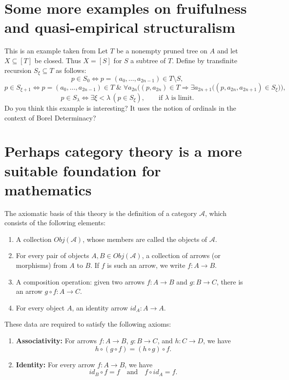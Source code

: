 \documentclass[11pt,a4paper]{book}
\theoremstyle{plain}
\begin{document}
\section{Some more examples on fruifulness and quasi-empirical structuralism}
This is an example taken from \textcite[139]{Kechris1995} Let $T$ be a nonempty pruned tree on $A$ and let $X \subseteq [T]$ be closed. Thus $X=[S]$ for $S$ a subtree of $T$. Define by transfinite recursion $S_\xi \subseteq T$ as follows: \[ p \in S_0 \iff p=(a_0,\ldots,a_{2n-1}) \in T \setminus S, \] \[ p \in S_{\xi+1} \iff p=(a_0,\ldots,a_{2n-1}) \in T \;\&\; \forall a_{2n} \bigl( (p, a_{2n}) \in T \Rightarrow \exists a_{2n+1} \bigl( (p, a_{2n}, a_{2n+1}) \in S_\xi \bigr) \bigr), \] \[ p \in S_\lambda \iff \exists \xi < \lambda \, (p \in S_\xi), \qquad \text{if $\lambda$ is limit.} \] Do you think this example is interesting? It uses the notion of ordinals in the context of Borel Determinacy?

\section{Perhaps category theory is a more suitable foundation for mathematics}

The axiomatic basis of this theory is the definition of a category $\mathcal{A}$, which consists of the following elements:

\begin{enumerate}
  \item A collection $Obj(\mathcal{A})$, whose members are called the objects of $\mathcal{A}$.
  \item For every pair of objects $A, B \in Obj(\mathcal{A})$, a collection of arrows (or morphisms) from $A$ to $B$. If $f$ is such an arrow, we write $f: A \rightarrow B$.
  \item A composition operation: given two arrows $f: A \rightarrow B$ and $g: B \rightarrow C$, there is an arrow $g \circ f: A \rightarrow C$.
  \item For every object $A$, an identity arrow $id_A: A \rightarrow A$.
\end{enumerate}

These data are required to satisfy the following axioms:

\begin{enumerate}
  \item \textbf{Associativity:} For arrows $f: A \rightarrow B$, $g: B \rightarrow C$, and $h: C \rightarrow D$, we have
  \[
  h \circ (g \circ f) = (h \circ g) \circ f.
  \]
  \item \textbf{Identity:} For every arrow $f: A \rightarrow B$, we have
  \[
  id_B \circ f = f \quad \text{and} \quad f \circ id_A = f.
  \]
\end{enumerate}
\end{document}
